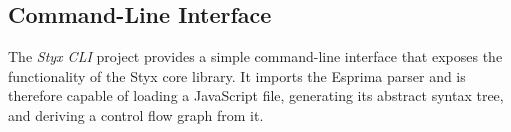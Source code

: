 \subsection{Command-Line Interface}
\label{sec:styx-cli}

The \emph{Styx CLI} project provides a simple command-line interface that exposes the functionality of the Styx core library. It imports the Esprima \cite{esprima} parser and is therefore capable of loading a JavaScript file, generating its abstract syntax tree, and deriving a control flow graph from it.




